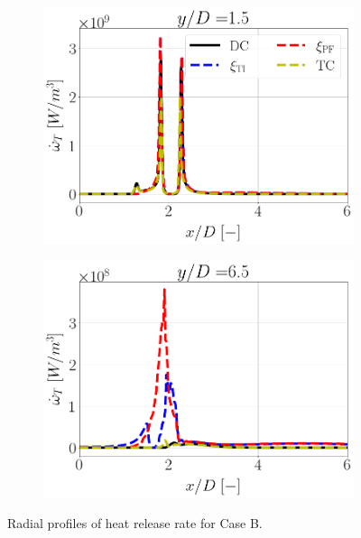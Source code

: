 \documentclass[preprint,12pt,authoryear]{elsarticle}
\begin{document}
{\begin{figure}[h!]
    \begin{subfigure}[b]{0.45\textwidth}
        \centering
        \includegraphics[scale=0.24]{./figures/profiles_a_posteriori/profile_y_5mm}
    \end{subfigure}
    \hspace{0.45in}
    \begin{subfigure}[b]{0.45\textwidth}
        \centering
        \includegraphics[scale=0.24]{./figures/profiles_a_posteriori/profile_y_20mm}
    \end{subfigure}
	\caption{Radial profiles of heat release rate for Case B.}
	\label{fig:HRR_profiles_a_posteriori}
\end{figure}

}
\end{document}
